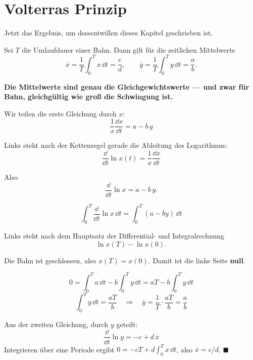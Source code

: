 \section{Volterras Prinzip}

Jetzt das Ergebnis, um dessentwillen dieses Kapitel geschrieben ist.

\begin{merksatz}
Sei $T$ die Umlaufdauer einer Bahn. Dann gilt für die zeitlichen Mittelwerte
\[ \overline{x} = \frac{1}{T}\int_0^T x\,\dd t = \frac{c}{d}, \qquad \overline{y} = \frac{1}{T}\int_0^T y\,\dd t = \frac{a}{b} . \]

\begin{center}
\begin{minipage}{0.9\textwidth}
\textbf{Die Mittelwerte sind genau die Gleichgewichtswerte --- und zwar für  Bahn, gleichgültig wie groß die Schwingung ist.}
\end{minipage}
\end{center}
\end{merksatz}

\begin{merksatz}
Wir teilen die erste Gleichung durch $x$:
\[ \frac{1}{x}\frac{\dd x}{\dd t} = a - b\,y \]

Links steht nach der Kettenregel gerade die Ableitung des Logarithmus:
\[ \frac{\dd}{\dd t}\ln x(t) = \frac{1}{x}\frac{\dd x}{\dd t} \]

Also
\[ \frac{\dd}{\dd t}\ln x = a - b\,y . \]

\[ \int_0^T \frac{\dd}{\dd t}\ln x\,\dd t = \int_0^T (a - by)\,\dd t \]

Links steht nach dem Hauptsatz der Differential- und Integralrechnung
\[ \ln x(T) - \ln x(0) . \]

Die Bahn ist geschlossen, also $x(T) = x(0)$. Damit ist die linke Seite \textbf{null}.

\[ 0 = \int_0^T a\,\dd t - b\int_0^T y\,\dd t = aT - b\int_0^T y\,\dd t \]
\[ \int_0^T y\,\dd t = \frac{aT}{b} \quad\Longrightarrow\quad \overline y = \frac{1}{T}\cdot\frac{aT}{b} = \frac{a}{b} \]

Aus der zweiten Gleichung, durch $y$ geteilt:
\[ \frac{\dd}{\dd t}\ln y = -c + d\,x \]
Integrieren über eine Periode ergibt $0 = -cT + d\int_0^T x\,\dd t$, also $\overline x = c/d$. $\blacksquare$

\begin{center}
\begin{minipage}{0.88\textwidth}
\end{minipage}
\end{center}
\end{merksatz}

